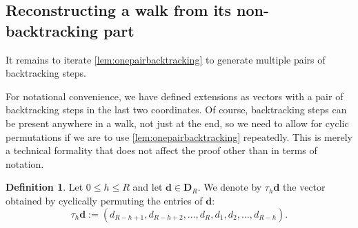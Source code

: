 \documentclass[11pt]{amsart}
\theoremstyle{definition}
\newtheorem{definition}[theorem]{Definition}
\renewcommand{\leq}{\leqslant}
\renewcommand{\d}{\boldsymbol{d}}
\newcommand{\fancyD}{\mathbf{D}}
\newcommand{\Dsfmix}[1]{\fancyD_{\!#1}}
\newcommand{\tupsize}{R}
\begin{document}
\subsection{Reconstructing a walk from its non-backtracking part}

It remains to iterate \cref{lem:onepairbacktracking} to generate multiple pairs of backtracking steps. 

For notational convenience, we have defined extensions as vectors with a pair of backtracking steps in the last two coordinates. Of course, backtracking steps can be present anywhere in a walk, not just at the end, so we need to allow for cyclic permutations if we are to use \cref{lem:onepairbacktracking} repeatedly. This is merely a technical formality that does not affect the proof other than in terms of notation.

\begin{definition}
\label{def:cyclicperm}
Let $0\leq h\leq \tupsize$ and let $\d\in \Dsfmix{\tupsize}$. We denote by $\tau_h\d$ the vector obtained by cyclically permuting the entries of $\d$:
\begin{equation*}
	\tau_h\d  := (d_{\tupsize-h+1}, d_{\tupsize-h+2}, \ldots, d_{\tupsize}, d_1, d_2, \ldots, d_{\tupsize-h}).
\end{equation*}
\end{definition}
\end{document}
